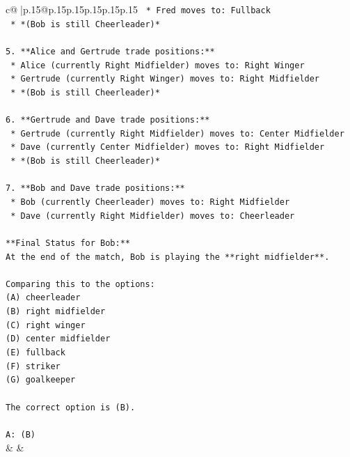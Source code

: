 \documentclass{article}
\begin{document}
{\begin{supertabular}{c@{$\;$}|p{.15\linewidth}@{}p{.15\linewidth}p{.15\linewidth}p{.15\linewidth}p{.15\linewidth}p{.15\linewidth}}
{{{\texttt{    *   Fred moves to: Fullback} \\
\texttt{    *   *(Bob is still Cheerleader)*} \\
\\ 
\texttt{5.  **Alice and Gertrude trade positions:**} \\
\texttt{    *   Alice (currently Right Midfielder) moves to: Right Winger} \\
\texttt{    *   Gertrude (currently Right Winger) moves to: Right Midfielder} \\
\texttt{    *   *(Bob is still Cheerleader)*} \\
\\ 
\texttt{6.  **Gertrude and Dave trade positions:**} \\
\texttt{    *   Gertrude (currently Right Midfielder) moves to: Center Midfielder} \\
\texttt{    *   Dave (currently Center Midfielder) moves to: Right Midfielder} \\
\texttt{    *   *(Bob is still Cheerleader)*} \\
\\ 
\texttt{7.  **Bob and Dave trade positions:**} \\
\texttt{    *   Bob (currently Cheerleader) moves to: Right Midfielder} \\
\texttt{    *   Dave (currently Right Midfielder) moves to: Cheerleader} \\
\\ 
\texttt{**Final Status for Bob:**} \\
\texttt{At the end of the match, Bob is playing the **right midfielder**.} \\
\\ 
\texttt{Comparing this to the options:} \\
\texttt{(A) cheerleader} \\
\texttt{(B) right midfielder} \\
\texttt{(C) right winger} \\
\texttt{(D) center midfielder} \\
\texttt{(E) fullback} \\
\texttt{(F) striker} \\
\texttt{(G) goalkeeper} \\
\\ 
\texttt{The correct option is (B).} \\
\\ 
\texttt{A: (B)} \\
            }
        }
    }
    & & \\ \\


\end{supertabular}}
\end{document}
